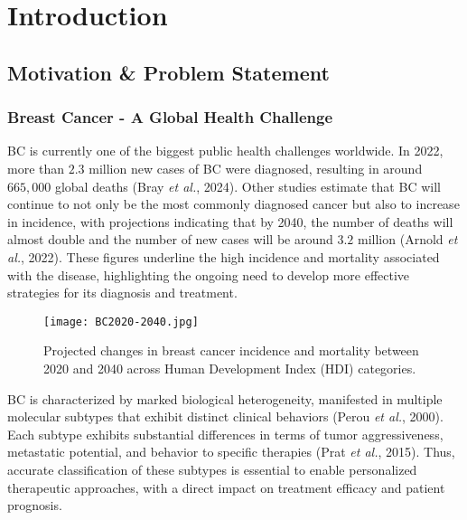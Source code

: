 
%

\chapter{Introduction}
\label{cha:introduction}

\section{Motivation \& Problem Statement}
\label{sec:motivation+problem-statement}
\subsection{Breast Cancer - A Global Health Challenge}
\gls{BC} is currently one of the biggest public health challenges worldwide. In 2022, 
more than $2.3$ million new cases of \gls{BC} were diagnosed, resulting in around $665,\!000$ global deaths 
\cite{bcaData2024_bray} (Bray \textit{et al.}, 2024). Other studies estimate that \gls{BC} will continue to not only be 
the most commonly diagnosed cancer but also to increase in incidence, with projections indicating that by 2040, the number 
of deaths will almost double and the number of new cases will be around $3.2$ million \cite{bca_data_Arnold2022Current} 
(Arnold \textit{et al.}, 2022). These figures underline the high incidence and mortality 
associated with the disease, highlighting the ongoing need to develop more effective strategies for its diagnosis 
and treatment.

\begin{figure}[h!]
    \centering
    \texttt{[image: BC2020-2040.jpg]} %
    \caption{Projected changes in breast cancer incidence and mortality between 2020 and 2040 across Human Development 
    Index (HDI) categories. \cite{bca_data_Arnold2022Current}}
    \label{fig:bc_incidence_mortality}
\end{figure}


BC is characterized by marked biological heterogeneity, manifested in multiple molecular subtypes that exhibit distinct 
clinical behaviors \cite{bc_molecular_Perou2000} (Perou \textit{et al.}, 2000). Each subtype exhibits substantial differences in 
terms of tumor aggressiveness, metastatic potential, and behavior to specific therapies 
\cite{bc_subtypes_Prat2015Clinical} (Prat \textit{et al.}, 2015). Thus, accurate classification of these subtypes is essential 
to enable personalized therapeutic approaches, with a direct impact on treatment efficacy and patient prognosis.

